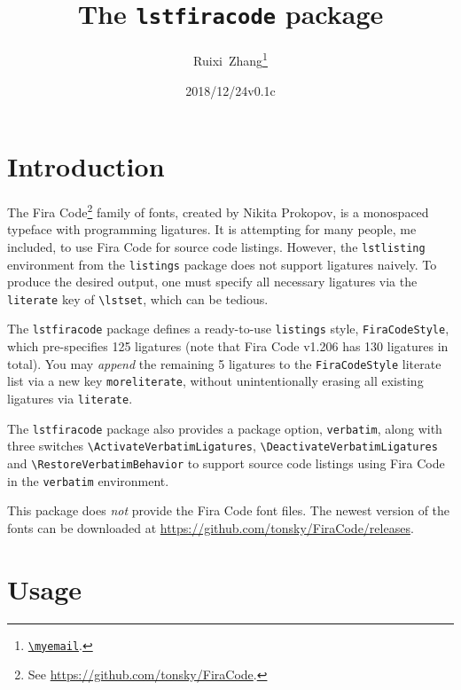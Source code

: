 \documentclass[11pt]{article}
\title{The \texttt{lstfiracode} package}
\author{Ruixi~Zhang\thanks{\href{mailto:\myemail}{\nolinkurl{\myemail}}.}}
\date{2018/12/24\enskip v0.1c}
\begin{document}
\maketitle

\tableofcontents
{}

\section{Introduction}

The Fira Code\footnote{See \url{https://github.com/tonsky/FiraCode}.} family
of fonts, created by Nikita Prokopov, is a monospaced typeface with
programming ligatures.
It is attempting for many people, me included, to use Fira Code for source
code listings.
However, the \verb|lstlisting| environment from the \verb|listings| package
does not support ligatures naively. To produce the desired output, one must
specify all necessary ligatures via the \verb|literate| key
of \verb|\lstset|, which can be tedious.

The \verb|lstfiracode| package defines a ready-to-use \verb|listings| style,
\verb|FiraCodeStyle|, which pre-specifies 125 ligatures
(note that Fira Code v1.206 has 130 ligatures in total).
You may \emph{append} the remaining 5 ligatures to the \verb|FiraCodeStyle|
literate list via a new key \verb|moreliterate|, without unintentionally
erasing all existing ligatures via \verb|literate|.

The \verb|lstfiracode| package also provides a package option,
\verb|verbatim|, along with three switches
\verb|\ActivateVerbatimLigatures|, \verb|\DeactivateVerbatimLigatures|
and \verb|\RestoreVerbatimBehavior|
to support source code listings using Fira Code
in the \verb|verbatim| environment.

This package does \emph{not} provide the Fira Code font files.
The newest version of the fonts can be downloaded at
\url{https://github.com/tonsky/FiraCode/releases}.

\section{Usage}
\end{document}
